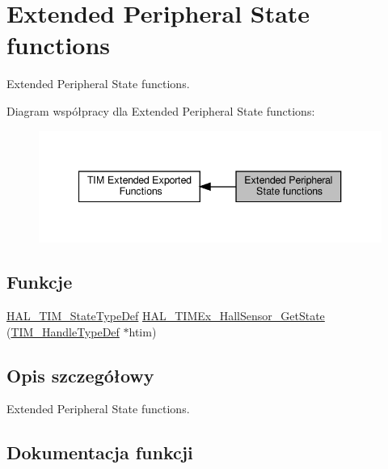 \hypertarget{group___t_i_m_ex___exported___functions___group7}{}\section{Extended Peripheral State functions}
\label{group___t_i_m_ex___exported___functions___group7}


Extended Peripheral State functions.  


Diagram współpracy dla Extended Peripheral State functions\+:\nopagebreak
\begin{figure}[H]
\begin{center}
\leavevmode
\includegraphics[width=340pt]{group___t_i_m_ex___exported___functions___group7}
\end{center}
\end{figure}
\subsection*{Funkcje}
\begin{DoxyCompactItemize}
\item 
\hyperlink{group___t_i_m___exported___types_gae0994cf5970e56ca4903e9151f40010c}{H\+A\+L\+\_\+\+T\+I\+M\+\_\+\+State\+Type\+Def} \hyperlink{group___t_i_m_ex___exported___functions___group7_ga69d56afa939909717370413d35311dbd}{H\+A\+L\+\_\+\+T\+I\+M\+Ex\+\_\+\+Hall\+Sensor\+\_\+\+Get\+State} (\hyperlink{struct_t_i_m___handle_type_def}{T\+I\+M\+\_\+\+Handle\+Type\+Def} $\ast$htim)
\end{DoxyCompactItemize}


\subsection{Opis szczegółowy}
Extended Peripheral State functions. 



\subsection{Dokumentacja funkcji}
\mbox{\label{group___t_i_m_ex___exported___functions___group7_ga69d56afa939909717370413d35311dbd}} 
